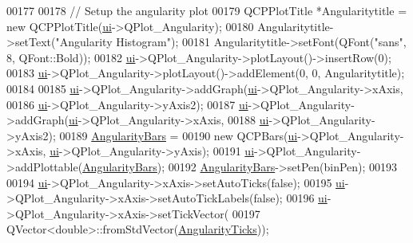 \begin{DoxyCode}
{00177 
00178   \textcolor{comment}{// Setup the angularity plot}
00179   QCPPlotTitle *Angularitytitle = \textcolor{keyword}{new} QCPPlotTitle(\hyperlink{class_v_s_a_main_window_a958a0581d2bf1bfe020c3b5d8f738640}{ui}->QPlot\_Angularity);
00180   Angularitytitle->setText(\textcolor{stringliteral}{"Angularity Histogram"});
00181   Angularitytitle->setFont(QFont(\textcolor{stringliteral}{"sans"}, 8, QFont::Bold));
00182   \hyperlink{class_v_s_a_main_window_a958a0581d2bf1bfe020c3b5d8f738640}{ui}->QPlot\_Angularity->plotLayout()->insertRow(0);
00183   \hyperlink{class_v_s_a_main_window_a958a0581d2bf1bfe020c3b5d8f738640}{ui}->QPlot\_Angularity->plotLayout()->addElement(0, 0, Angularitytitle);
00184 
00185   \hyperlink{class_v_s_a_main_window_a958a0581d2bf1bfe020c3b5d8f738640}{ui}->QPlot\_Angularity->addGraph(\hyperlink{class_v_s_a_main_window_a958a0581d2bf1bfe020c3b5d8f738640}{ui}->QPlot\_Angularity->xAxis,
00186                                  \hyperlink{class_v_s_a_main_window_a958a0581d2bf1bfe020c3b5d8f738640}{ui}->QPlot\_Angularity->yAxis2);
00187   \hyperlink{class_v_s_a_main_window_a958a0581d2bf1bfe020c3b5d8f738640}{ui}->QPlot\_Angularity->addGraph(\hyperlink{class_v_s_a_main_window_a958a0581d2bf1bfe020c3b5d8f738640}{ui}->QPlot\_Angularity->xAxis,
00188                                  \hyperlink{class_v_s_a_main_window_a958a0581d2bf1bfe020c3b5d8f738640}{ui}->QPlot\_Angularity->yAxis2);
00189   \hyperlink{class_v_s_a_main_window_ac4dc27e6a351ad60f434357aeac9f1c0}{AngularityBars} =
00190       \textcolor{keyword}{new} QCPBars(\hyperlink{class_v_s_a_main_window_a958a0581d2bf1bfe020c3b5d8f738640}{ui}->QPlot\_Angularity->xAxis, \hyperlink{class_v_s_a_main_window_a958a0581d2bf1bfe020c3b5d8f738640}{ui}->QPlot\_Angularity->yAxis);
00191   \hyperlink{class_v_s_a_main_window_a958a0581d2bf1bfe020c3b5d8f738640}{ui}->QPlot\_Angularity->addPlottable(\hyperlink{class_v_s_a_main_window_ac4dc27e6a351ad60f434357aeac9f1c0}{AngularityBars});
00192   \hyperlink{class_v_s_a_main_window_ac4dc27e6a351ad60f434357aeac9f1c0}{AngularityBars}->setPen(binPen);
00193 
00194   \hyperlink{class_v_s_a_main_window_a958a0581d2bf1bfe020c3b5d8f738640}{ui}->QPlot\_Angularity->xAxis->setAutoTicks(\textcolor{keyword}{false});
00195   \hyperlink{class_v_s_a_main_window_a958a0581d2bf1bfe020c3b5d8f738640}{ui}->QPlot\_Angularity->xAxis->setAutoTickLabels(\textcolor{keyword}{false});
00196   \hyperlink{class_v_s_a_main_window_a958a0581d2bf1bfe020c3b5d8f738640}{ui}->QPlot\_Angularity->xAxis->setTickVector(
00197       QVector<double>::fromStdVector(\hyperlink{class_v_s_a_main_window_ab3adb6772a4766285b7b96e0fb407f62}{AngularityTicks}));
}
\end{DoxyCode}
